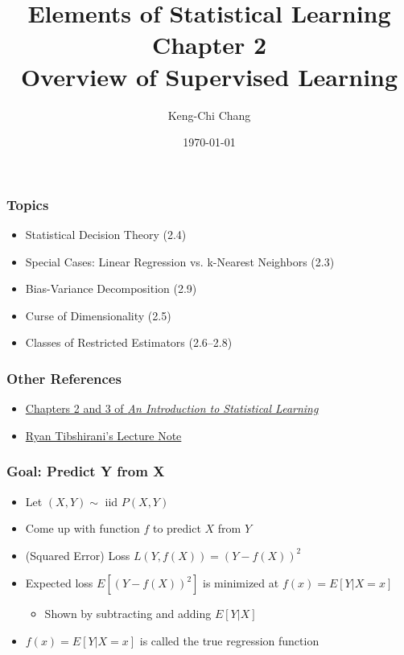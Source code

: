 \documentclass[12pt, xcolor = dvipsnames]{beamer}
\title{Elements of Statistical Learning\\ Chapter 2\\ Overview of Supervised Learning}
\subtitle{}
\author{Keng-Chi Chang}
\date{\today}
\begin{document}
\fontsize{12}{14pt}\selectfont

\maketitle

\begin{frame}
\frametitle{Topics}
\begin{itemize}
  \item Statistical Decision Theory (2.4)
  \item Special Cases: Linear Regression vs. k-Nearest Neighbors (2.3)
  \item Bias-Variance Decomposition (2.9)
  \item Curse of Dimensionality (2.5)
  \item Classes of Restricted Estimators (2.6--2.8)
\end{itemize}
\end{frame}


\begin{frame}
\frametitle{Other References}
\begin{itemize}
  \item \href{http://www-bcf.usc.edu/~gareth/ISL/}{Chapters 2 and 3 of {\it An Introduction to Statistical Learning}}
  \item \href{http://www.stat.cmu.edu/~ryantibs/statml/review/modelbasics.pdf}{Ryan Tibshirani's Lecture Note}
\end{itemize}
\end{frame}


\begin{frame}
\frametitle{Goal: Predict Y from X}
\begin{itemize}
  \item Let $(X,Y)\sim$ iid $P(X,Y)$
  \item Come up with function $f$ to predict $X$ from $Y$
  \item (Squared Error) Loss $L(Y, f(X))=(Y-f(X))^2$
  \item Expected loss $E[(Y-f(X))^2]$ is minimized at $f(x)=E[Y|X=x]$
  \begin{itemize}
    \item Shown by subtracting and adding $E[Y|X]$
  \end{itemize}
  \item $f(x)=E[Y|X=x]$ is called the true regression function
\end{itemize}
\end{frame}
\end{document}
